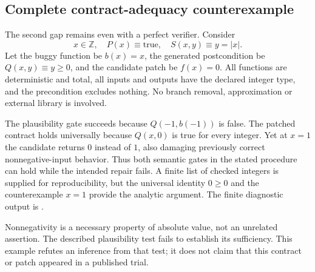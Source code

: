 \documentclass[10pt]{article}
\begin{document}
\subsection*{Complete contract-adequacy counterexample}
The second gap remains even with a perfect verifier. Consider \[x\in\mathbb Z,\quad P(x)\equiv\mathrm{true},\quad
S(x,y)\equiv y=|x|.\] Let the buggy function be \(b(x)=x\), the generated postcondition be \(Q(x,y)\equiv y\geq0\), and the candidate patch be \(f(x)=0\). All functions are deterministic and total, all inputs and outputs have the declared integer type, and the precondition excludes nothing. No branch removal, approximation or external library is involved.\par
The plausibility gate succeeds because \(Q(-1,b(-1))\) is false. The patched contract holds universally because \(Q(x,0)\) is true for every integer. Yet at \(x=1\) the candidate returns \(0\) instead of \(1\), also damaging previously correct nonnegative-input behavior. Thus both semantic gates in the stated procedure can hold while the intended repair fails. A finite list of checked integers is supplied for reproducibility, but the universal identity \(0\geq0\) and the counterexample \(x=1\) provide the analytic argument. The finite diagnostic output is .\par
Nonnegativity is a necessary property of absolute value, not an unrelated assertion. The described plausibility test fails to establish its sufficiency. This example refutes an inference from that test; it does not claim that this contract or patch appeared in a published trial.\par
\end{document}
